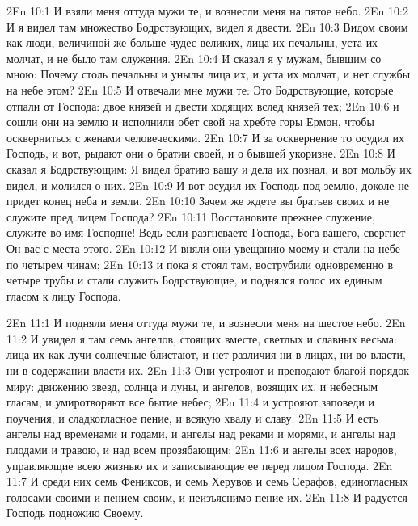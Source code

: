 \vs 2En 10:1
И взяли меня оттуда мужи те, и вознесли меня на пятое небо.
\vs 2En 10:2
И я видел там множество Бодрствующих, видел я двести.
\vs 2En 10:3
Видом своим как люди, величиной же больше чудес великих, лица их печальны, уста их молчат, и не было там служения.
\vs 2En 10:4
И сказал я у мужам, бывшим со мною: Почему столь печальны и унылы лица их, и уста их молчат, и нет службы на небе этом?
\vs 2En 10:5
И отвечали мне мужи те: Это Бодрствующие, которые отпали от Господа: двое князей и двести ходящих вслед князей тех;
\vs 2En 10:6
и сошли они на землю и исполнили обет свой на хребте горы Ермон, чтобы оскверниться с женами человеческими.
\vs 2En 10:7
И за осквернение то осудил их Господь, и вот, рыдают они о братии своей, и о бывшей укоризне.
\vs 2En 10:8
И сказал я Бодрствующим: Я видел братию вашу и дела их познал, и вот мольбу их видел, и молился о них.
\vs 2En 10:9
И вот осудил их Господь под землю, доколе не придет конец неба и земли.
\vs 2En 10:10
Зачем же ждете вы братьев своих и не служите пред лицем Господа?
\vs 2En 10:11
Восстановите прежнее служение, служите во имя Господне! Ведь если разгневаете Господа, Бога вашего, свергнет Он вас с места этого.
\vs 2En 10:12
И вняли они увещанию моему и стали на небе по четырем чинам;
\vs 2En 10:13
и пока я стоял там, вострубили одновременно в четыре трубы и стали служить Бодрствующие, и поднялся голос их единым гласом к лицу Господа.

\vs 2En 11:1
И подняли меня оттуда мужи те, и вознесли меня на шестое небо.
\vs 2En 11:2
И увидел я там семь ангелов, стоящих вместе, светлых и славных весьма: лица их как лучи солнечные блистают, и нет различия ни в лицах, ни во власти, ни в содержании власти их.
\vs 2En 11:3
Они устрояют и преподают благой порядок миру: движению звезд, солнца и луны, и ангелов, возящих их, и небесным гласам, и умиротворяют все бытие небес;
\vs 2En 11:4
и устрояют заповеди и поучения, и сладкогласное пение, и всякую хвалу и славу.
\vs 2En 11:5
И есть ангелы над временами и годами, и ангелы над реками и морями, и ангелы над плодами и травою, и над всем прозябающим;
\vs 2En 11:6
и ангелы всех народов, управляющие всею жизнью их и записывающие ее перед лицом Господа.
\vs 2En 11:7
И среди них семь Фениксов, и семь Херувов и семь Серафов, единогласных голосами своими и пением своим, и неизъяснимо пение их.
\vs 2En 11:8
И радуется Господь подножию Своему.

